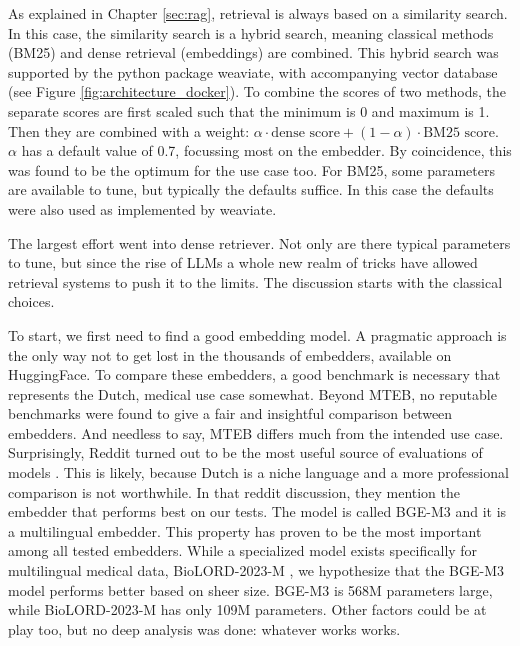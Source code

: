 As explained in Chapter \ref{sec:rag}, retrieval is always based on a similarity search. In this case, the similarity search is a hybrid search, meaning classical methods (BM25) and dense retrieval (embeddings) are combined. This hybrid search was supported by the python package weaviate, with accompanying vector database (see Figure \ref{fig:architecture_docker}). To combine the scores of two methods, the separate scores are first scaled such that the minimum is 0 and maximum is 1. Then they are combined with a weight: $\alpha \cdot \text{dense score} + (1-\alpha) \cdot \text{BM25 score}$. $\alpha$ has a default value of 0.7, focussing most on the embedder. By coincidence, this was found to be the optimum for the use case too. For BM25, some parameters are available to tune, but typically the defaults suffice. In this case the defaults were also used as implemented by weaviate.

The largest effort went into dense retriever. Not only are there typical parameters to tune, but since the rise of LLMs a whole new realm of tricks have allowed retrieval systems to push it to the limits. The discussion starts with the classical choices.

To start, we first need to find a good embedding model. A pragmatic approach is the only way not to get lost in the thousands of embedders, available on HuggingFace. To compare these embedders, a good benchmark is necessary that represents the Dutch, medical use case somewhat. Beyond MTEB, no reputable benchmarks were found to give a fair and insightful comparison between embedders. And needless to say, MTEB differs much from the intended use case. Surprisingly, Reddit turned out to be the most useful source of evaluations of models \cite{reddit2025embedding}. This is likely, because Dutch is a niche language and a more professional comparison is not worthwhile. In that reddit discussion, they mention the embedder that performs best on our tests. The model is called BGE-M3 and it is a multilingual embedder. This property has proven to be the most important among all tested embedders. While a specialized model exists specifically for multilingual medical data, BioLORD-2023-M \cite{remy2024biolord}, we hypothesize that the BGE-M3 model performs better based on sheer size. BGE-M3 is 568M parameters large, while BioLORD-2023-M has only 109M parameters. Other factors could be at play too, but no deep analysis was done: whatever works works.

